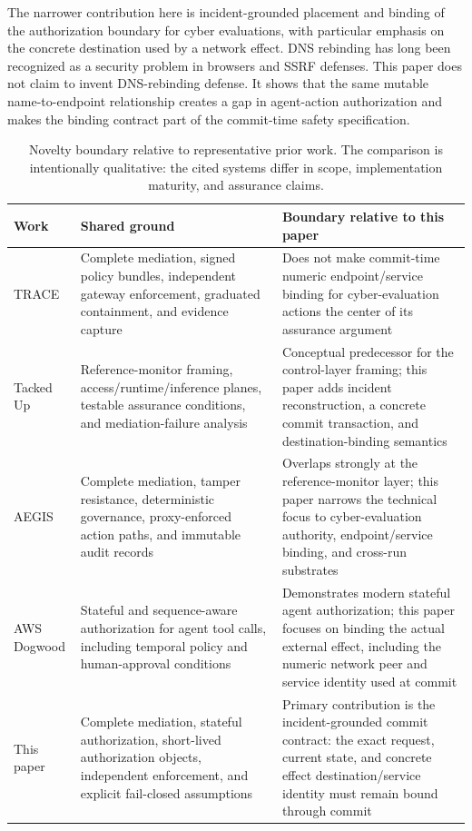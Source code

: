 \documentclass[11pt,letterpaper]{article}
\begin{document}
The narrower contribution here is incident-grounded placement and binding of the authorization boundary for cyber evaluations, with particular emphasis on the concrete destination used by a network effect. DNS rebinding has long been recognized as a security problem in browsers and SSRF defenses.\cite{jackson2009,owasp-ssrf} This paper does not claim to invent DNS-rebinding defense. It shows that the same mutable name-to-endpoint relationship creates a gap in agent-action authorization and makes the binding contract part of the commit-time safety specification.

\begin{table}[htbp]
\centering
\caption{Novelty boundary relative to representative prior work. The comparison is intentionally qualitative: the cited systems differ in scope, implementation maturity, and assurance claims.}
\small
\begin{tabularx}{\linewidth}{L{1.05in}Y Y}
\toprule
\textbf{Work} & \textbf{Shared ground} & \textbf{Boundary relative to this paper} \\
\midrule
TRACE & Complete mediation, signed policy bundles, independent gateway enforcement, graduated containment, and evidence capture & Does not make commit-time numeric endpoint/service binding for cyber-evaluation actions the center of its assurance argument \\
Tacked Up & Reference-monitor framing, access/runtime/inference planes, testable assurance conditions, and mediation-failure analysis & Conceptual predecessor for the control-layer framing; this paper adds incident reconstruction, a concrete commit transaction, and destination-binding semantics \\
AEGIS & Complete mediation, tamper resistance, deterministic governance, proxy-enforced action paths, and immutable audit records & Overlaps strongly at the reference-monitor layer; this paper narrows the technical focus to cyber-evaluation authority, endpoint/service binding, and cross-run substrates \\
AWS Dogwood & Stateful and sequence-aware authorization for agent tool calls, including temporal policy and human-approval conditions & Demonstrates modern stateful agent authorization; this paper focuses on binding the actual external effect, including the numeric network peer and service identity used at commit \\
This paper & Complete mediation, stateful authorization, short-lived authorization objects, independent enforcement, and explicit fail-closed assumptions & Primary contribution is the incident-grounded commit contract: the exact request, current state, and concrete effect destination/service identity must remain bound through commit \\
\bottomrule
\end{tabularx}
\end{table}
\end{document}
